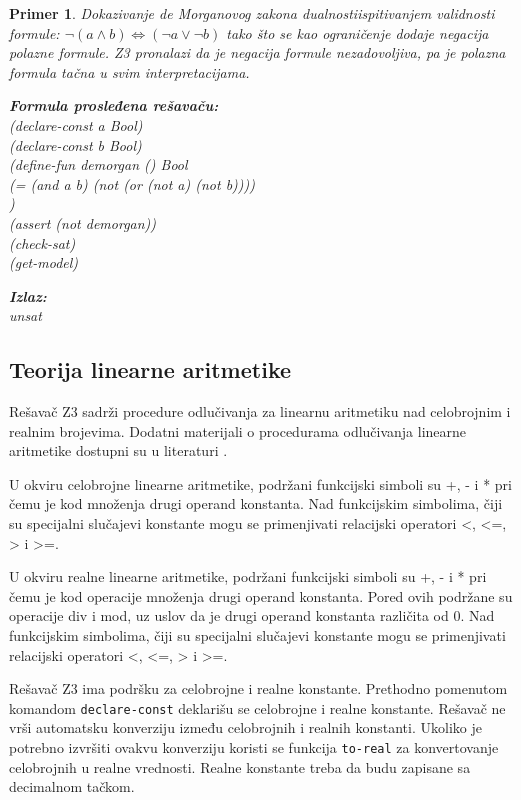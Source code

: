 \documentclass[12pt,oneside]{memoir}
\newcommand\tab[1][0.5cm]{\hspace*{#1}}
\newtheorem{primer}{Primer}
\begin{document}
\begin{primer} Dokazivanje de Morganovog zakona dualnosti\label{primer:demorgan} ispitivanjem validnosti formule: $\neg{(a \land b)} \Leftrightarrow (\neg{a} \lor \neg{b}) $ tako što se kao ograničenje dodaje negacija polazne formule. Z3 pronalazi da je negacija formule nezadovoljiva, pa je polazna formula tačna u svim interpretacijama. \\

\hspace{-0.6cm}
\begin{minipage}[b]{0.5\textwidth}
\textbf{Formula prosleđena rešavaču:}
\\(declare-const a Bool)
\\(declare-const b Bool)
\\(define-fun demorgan () Bool
\\\tab (= (and a b) (not (or (not a) (not b))))
\\)
\\(assert (not demorgan))
\\(check-sat) 
\\(get-model)
\end{minipage}
\hspace{1.5cm}
\begin{minipage}[t]{0.4\textwidth}
\vspace{-5.35cm}
\textbf{Izlaz:}
\\unsat
\end{minipage}
\end{primer}


\subsection{Teorija linearne aritmetike} 

Rešavač Z3 sadrži procedure odlučivanja za linearnu aritmetiku nad celobrojnim i realnim brojevima. Dodatni materijali o procedurama odlučivanja linearne aritmetike dostupni su u literaturi \cite{FastLinearArithmetic}.
\par

U okviru celobrojne linearne aritmetike, podržani funkcijski simboli su +, - i * pri čemu je kod množenja drugi operand konstanta. Nad funkcijskim simbolima, čiji su specijalni slučajevi konstante mogu se primenjivati relacijski operatori <, <=, > i >=. 
\par
U okviru realne linearne aritmetike, podržani funkcijski simboli su +, - i * pri čemu je kod operacije množenja drugi operand konstanta. Pored ovih podržane su operacije div i mod, uz uslov da je drugi operand konstanta različita od 0. Nad funkcijskim simbolima, čiji su specijalni slučajevi konstante mogu se primenjivati relacijski operatori <, <=, > i >=. 
\par
Rešavač Z3 ima podršku za celobrojne i realne konstante. Prethodno pomenutom komandom \texttt{declare-const} deklarišu se celobrojne i realne konstante. Rešavač ne vrši automatsku konverziju između celobrojnih i realnih konstanti. Ukoliko je potrebno izvršiti ovakvu konverziju koristi se funkcija \texttt{to-real} za konvertovanje celobrojnih u realne vrednosti.
Realne konstante treba da budu zapisane sa decimalnom tačkom.
\end{document}

